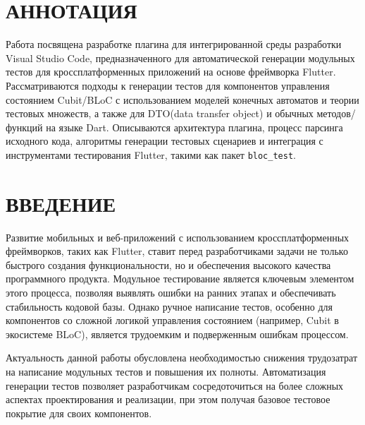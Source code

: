 \documentclass[14pt, russian]{scrartcl}
\newcommand{\anonsection}[1]{\cleardoublepage
\phantomsection
\addcontentsline{toc}{section}{\protect\numberline{}#1}
\section*{#1}\vspace*{2.5ex} %
}
\begin{document}

\setlength{\tabcolsep}{3pt}
\newpage
\setcounter{page}{2}

\section*{АННОТАЦИЯ}

Работа посвящена разработке плагина для интегрированной среды разработки Visual Studio Code, предназначенного для автоматической генерации модульных тестов для кроссплатформенных приложений на основе фреймворка Flutter. Рассматриваются подходы к генерации тестов для компонентов управления состоянием Cubit/BLoC с использованием моделей конечных автоматов и теории тестовых множеств, а также для DTO(data transfer object) и обычных методов/функций на языке Dart. Описываются архитектура плагина, процесс парсинга исходного кода, алгоритмы генерации тестовых сценариев и интеграция с инструментами тестирования Flutter, такими как пакет \texttt{bloc\_test}.


\newpage
\renewcommand\contentsname{\hfill{\normalfont{СОДЕРЖАНИЕ}}\hfill}
\tableofcontents
\newpage
\anonsection{ВВЕДЕНИЕ}

Развитие мобильных и веб-приложений с использованием кроссплатформенных фреймворков, таких как Flutter, ставит перед разработчиками задачи не только быстрого создания функциональности, но и обеспечения высокого качества программного продукта. Модульное тестирование является ключевым элементом этого процесса, позволяя выявлять ошибки на ранних этапах и обеспечивать стабильность кодовой базы. Однако ручное написание тестов, особенно для компонентов со сложной логикой управления состоянием (например, Cubit в экосистеме BLoC), является трудоемким и подверженным ошибкам процессом.

Актуальность данной работы обусловлена необходимостью снижения трудозатрат на написание модульных тестов и повышения их полноты. Автоматизация генерации тестов позволяет разработчикам сосредоточиться на более сложных аспектах проектирования и реализации, при этом получая базовое тестовое покрытие для своих компонентов.
\end{document}
